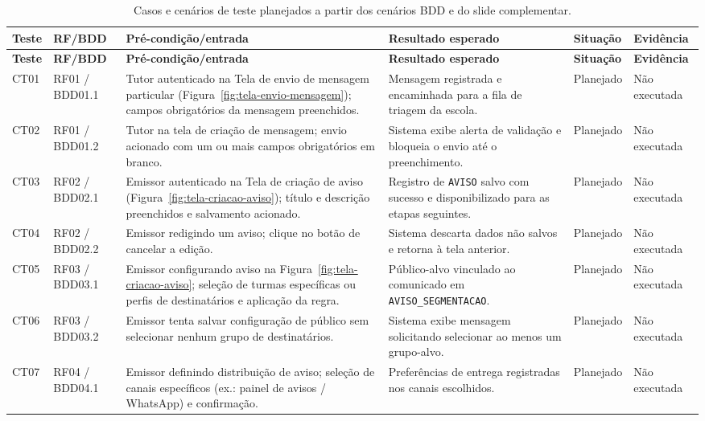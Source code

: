 \documentclass[a4paper,12pt]{report}
\begin{document}
\begin{longtable}{|p{1.2cm}|p{2.0cm}|p{3.8cm}|p{4.0cm}|p{1.6cm}|p{2.0cm}|}
\caption{Casos e cenários de teste planejados a partir dos cenários BDD e do slide complementar.} \label{tab:casos-teste} \\
\hline
\textbf{Teste} & \textbf{RF/BDD} & \textbf{Pré-condição/entrada} & \textbf{Resultado esperado} & \textbf{Situação} & \textbf{Evidência} \\
\hline
\endfirsthead
\hline
\textbf{Teste} & \textbf{RF/BDD} & \textbf{Pré-condição/entrada} & \textbf{Resultado esperado} & \textbf{Situação} & \textbf{Evidência} \\
\hline
\endhead
CT01 & RF01 / BDD01.1 & Tutor autenticado na Tela de envio de mensagem particular (Figura~\ref{fig:tela-envio-mensagem}); campos obrigatórios da mensagem preenchidos. & Mensagem registrada e encaminhada para a fila de triagem da escola. & Planejado & Não executada \\
\hline
CT02 & RF01 / BDD01.2 & Tutor na tela de criação de mensagem; envio acionado com um ou mais campos obrigatórios em branco. & Sistema exibe alerta de validação e bloqueia o envio até o preenchimento. & Planejado & Não executada \\
\hline
CT03 & RF02 / BDD02.1 & Emissor autenticado na Tela de criação de aviso (Figura~\ref{fig:tela-criacao-aviso}); título e descrição preenchidos e salvamento acionado. & Registro de \texttt{AVISO} salvo com sucesso e disponibilizado para as etapas seguintes. & Planejado & Não executada \\
\hline
CT04 & RF02 / BDD02.2 & Emissor redigindo um aviso; clique no botão de cancelar a edição. & Sistema descarta dados não salvos e retorna à tela anterior. & Planejado & Não executada \\
\hline
CT05 & RF03 / BDD03.1 & Emissor configurando aviso na Figura~\ref{fig:tela-criacao-aviso}; seleção de turmas específicas ou perfis de destinatários e aplicação da regra. & Público-alvo vinculado ao comunicado em \texttt{AVISO\_SEGMENTACAO}. & Planejado & Não executada \\
\hline
CT06 & RF03 / BDD03.2 & Emissor tenta salvar configuração de público sem selecionar nenhum grupo de destinatários. & Sistema exibe mensagem solicitando selecionar ao menos um grupo-alvo. & Planejado & Não executada \\
\hline
CT07 & RF04 / BDD04.1 & Emissor definindo distribuição de aviso; seleção de canais específicos (ex.: painel de avisos / WhatsApp) e confirmação. & Preferências de entrega registradas nos canais escolhidos. & Planejado & Não executada \\

\end{longtable}
\end{document}
